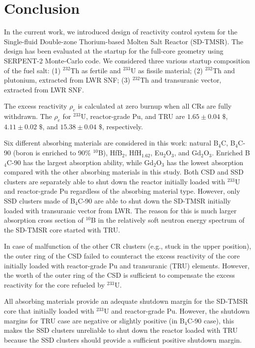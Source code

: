 \section{Conclusion} \label{Conclusion}
In the current work, we introduced design of reactivity control system for the 
Single-fluid Double-zone Thorium-based Molten Salt Reactor (SD-TMSR). The 
design has been evaluated at the startup for the full-core geometry using 
SERPENT-2 Monte-Carlo code. We considered three various startup composition of 
the fuel salt: (1) $^{232}$Th as fertile and $^{233}$U as fissile material; 
(2) $^{232}$Th and plutonium, extracted from \gls{LWR} \gls{SNF}; (3) 
$^{232}$Th and transuranic vector, extracted from \gls{LWR} \gls{SNF}.

The excess reactivity $\rho_e$ is calculated at zero burnup when all CRs are 
fully withdrawn. The $\rho_e$ for $^{233}$U, reactor-grade Pu, and 
TRU are $1.65\pm0.04$ $\$$, $4.11\pm0.02$ $\$$, and $15.38\pm0.04$ $\$$, 
respectively.

Six different absorbing materials are considered in this work:
natural B$_4$C, B$_4$C-90 (boron is enriched to 90\% $^{10}$B), HfB$_2$, 
HfH$_{1.62}$, Eu$_2$O$_3$, and Gd$_2$O$_3$. Enriched B$_4$C-90 has the largest 
absorption ability, while Gd$_2$O$_3$ has the lowest absorption compared with 
the other absorbing materials in this study. Both CSD and SSD clusters are 
separately able to shut down the reactor initially loaded with $^{233}$U and 
reactor-grade Pu regardless of the absorbing material type. However, only SSD 
clusters made of B$_4$C-90 are able to shut down the SD-TMSR initially loaded 
with transuranic vector from \gls{LWR}. The reason for this is much larger 
absorption cross section of $^{10}$B in the relatively soft neutron energy 
spectrum of the SD-TMSR core started with TRU.

In case of malfunction of the other CR clusters (e.g., stuck in the upper 
position), the outer ring of the CSD failed to counteract the excess 
reactivity of the core initially loaded with reactor-grade Pu and transuranic 
(TRU) elements. However, the worth of the outer ring of the CSD is sufficient 
to compensate the excess reactivity for the core refueled by $^{233}$U.

All absorbing materials provide an adequate shutdown margin for the SD-TMSR 
core that initially loaded with $^{233}$U and reactor-grade Pu. However, the 
shutdown margins for TRU case are negative or slightly positive (in B$_4$C-90 
case), this makes the SSD clusters unreliable to shut down the reactor loaded 
with TRU because the SSD clusters should provide a sufficient positive shutdown margin.

